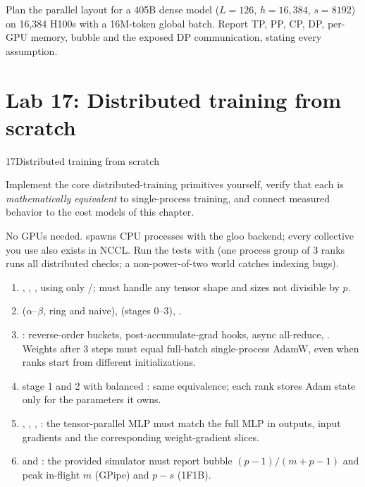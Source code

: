 \begin{exercise}
Plan the parallel layout for a 405B dense model ($L=126$, $h=16{,}384$, $s=8192$) on 16{,}384
H100s with a 16M-token global batch. Report TP, PP, CP, DP, per-GPU memory, bubble and the
exposed DP communication, stating every assumption.
\end{exercise}

\section{Lab 17: Distributed training from scratch}\label{sec:dist:lab}

\begin{labbox}{17}{Distributed training from scratch}

Implement the core distributed-training primitives yourself, verify that each is
\emph{mathematically equivalent} to single-process training, and connect measured behavior to
the cost models of this chapter.

No GPUs needed.  spawns CPU processes
with the gloo backend; every collective you use also exists in NCCL. Run the tests with
 (one process group of 3
ranks runs all distributed checks; a non-power-of-two world catches indexing bugs).

\begin{enumerate}
\item {}, , ,
   using only /; must handle any tensor shape and
  sizes not divisible by $p$.
\item {} ($\alpha$--$\beta$, ring and naive), 
  (stages 0--3), .
\item {}: reverse-order buckets, post-accumulate-grad hooks, async all-reduce,
  . Weights after 3 steps must equal full-batch
  single-process AdamW, even when ranks start from different initializations.
\item {} stage 1 and 2 with balanced : same equivalence;
  each rank stores Adam state only for the parameters it owns.
\item {}, , ,
  : the tensor-parallel MLP must match the full MLP in outputs, input
  gradients and the corresponding weight-gradient slices.
\item {} and : the provided simulator must report bubble
  $(p-1)/(m+p-1)$ and peak in-flight $m$ (GPipe) and $p-s$ (1F1B).
\end{enumerate}


\end{labbox}

